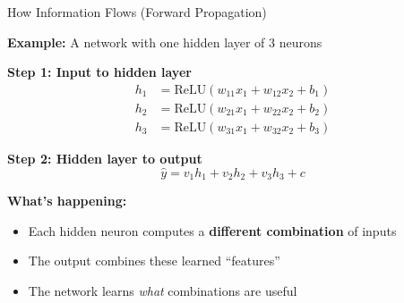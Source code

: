 \documentclass[10pt]{beamer}
\newcommand{\highlight}[1]{\textcolor{AccentOrange}{\textbf{#1}}}
\begin{document}

\begin{frame}{How Information Flows (Forward Propagation)}

  \textbf{Example:} A network with one hidden layer of 3 neurons

  \vspace{0.5em}
  \textbf{Step 1: Input to hidden layer}
  \begin{align*}
  h_1 &= \text{ReLU}(w_{11}x_1 + w_{12}x_2 + b_1) \\
  h_2 &= \text{ReLU}(w_{21}x_1 + w_{22}x_2 + b_2) \\
  h_3 &= \text{ReLU}(w_{31}x_1 + w_{32}x_2 + b_3)
  \end{align*}

  \textbf{Step 2: Hidden layer to output}
  \[
  \widehat{y} = v_1 h_1 + v_2 h_2 + v_3 h_3 + c
  \]

  \vspace{0.5em}
  \textbf{What's happening:}
  \begin{itemize}
    \item Each hidden neuron computes a \highlight{different combination} of inputs
    \item The output combines these learned ``features''
    \item The network learns \textit{what} combinations are useful
  \end{itemize}
\end{frame}

\end{document}
